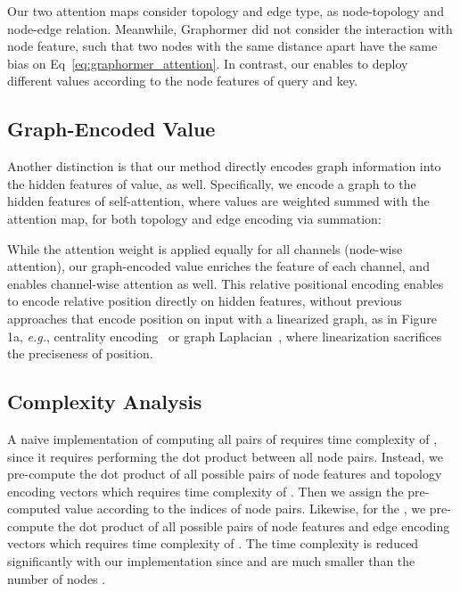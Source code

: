 \documentclass[letterpaper]{article} \usepackage{aaai23}  \usepackage{times}  \usepackage{helvet}  \usepackage{courier}  \usepackage[hyphens]{url}  \usepackage{graphicx} \urlstyle{rm} \def\UrlFont{\rm}  \usepackage{natbib}  \usepackage{caption} \frenchspacing  \setlength{\pdfpagewidth}{8.5in} \setlength{\pdfpageheight}{11in} \usepackage{algorithm}
\newcommand{\eg}{\textit{e.g.}}
\begin{document}
Our two attention maps consider topology and edge type, as node-topology and node-edge relation.
Meanwhile, Graphormer did not consider the interaction with node feature, such that
two nodes with the same distance apart have the same bias  on Eq~\ref{eq:graphormer_attention}.
In contrast, our  enables to deploy different values according to the node features of query and key. 


\subsection{Graph-Encoded Value}
\label{sec:graph_embedded_value}

Another distinction is that our method directly encodes graph information into the hidden features of value, as well.
Specifically, we encode a graph to the hidden features of self-attention, where values are weighted summed with the attention map, for both topology and edge encoding
 via summation:


While the attention weight  is applied equally for all channels (node-wise attention),  our graph-encoded value enriches 
the feature of each channel, and enables channel-wise attention as well.
This relative positional encoding enables to encode relative position directly on hidden features, without 
previous approaches that encode position on input  with a linearized graph, as in Figure 1a, \eg, centrality encoding~\citep{ying2021transformers} or graph Laplacian~\citep{san_kreuzer2021rethinking,gt_dwivedi2020generalization},
where linearization sacrifices the preciseness of position.





\subsection{Complexity Analysis}
\label{sec:efficient_impl}

A naive implementation of computing all pairs of  requires time complexity of , since it requires performing the dot product between all node pairs.
Instead, we pre-compute the dot product of all possible pairs of node features and topology encoding vectors  which requires time complexity of . 
Then we assign the pre-computed value according to the indices of node pairs.
Likewise, for the , we pre-compute the dot product of all possible pairs of node features and edge encoding vectors  which requires time complexity of .
The time complexity is reduced significantly with our implementation since  and  are much smaller than the number of nodes .
\end{document}
